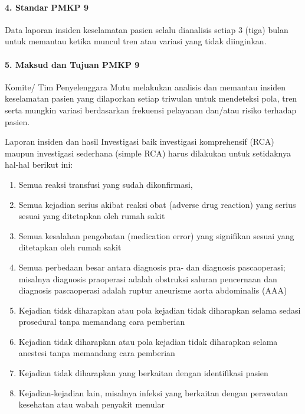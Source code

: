 \documentclass[
]{book}
\providecommand{\tightlist}{%
  \setlength{\itemsep}{0pt}\setlength{\parskip}{0pt}}
\begin{document}
\hypertarget{standar-pmkp-9}{%
\paragraph*{4. Standar PMKP 9}\label{standar-pmkp-9}}

Data laporan insiden keselamatan pasien selalu dianalisis setiap 3 (tiga) bulan untuk memantau ketika muncul tren atau variasi yang tidak diinginkan.

\hypertarget{maksud-dan-tujuan-pmkp-9}{%
\paragraph*{5. Maksud dan Tujuan PMKP 9}\label{maksud-dan-tujuan-pmkp-9}}

Komite/ Tim Penyelenggara Mutu melakukan analisis dan memantau insiden keselamatan pasien yang dilaporkan setiap triwulan untuk mendeteksi pola, tren serta mungkin variasi berdasarkan frekuensi pelayanan dan/atau risiko terhadap pasien.

Laporan insiden dan hasil Investigasi baik investigasi komprehensif (RCA) maupun investigasi sederhana (simple RCA) harus dilakukan untuk setidaknya hal-hal berikut ini:

\begin{enumerate}
\def\labelenumi{\alph{enumi}.}
\tightlist
\item
  Semua reaksi transfusi yang sudah dikonfirmasi,
\item
  Semua kejadian serius akibat reaksi obat (adverse drug reaction) yang serius sesuai yang ditetapkan oleh rumah sakit
\item
  Semua kesalahan pengobatan (medication error) yang signifikan sesuai yang ditetapkan oleh rumah sakit
\item
  Semua perbedaan besar antara diagnosis pra- dan diagnosis pascaoperasi; misalnya diagnosis praoperasi adalah obstruksi saluran pencernaan dan diagnosis pascaoperasi adalah ruptur aneurisme aorta abdominalis (AAA)
\item
  Kejadian tidsk diharapkan atau pola kejadian tidak diharapkan selama sedasi prosedural tanpa memandang cara pemberian
\item
  Kejadian tidak diharapkan atau pola kejadian tidak diharapkan selama anestesi tanpa memandang cara pemberian
\item
  Kejadian tidak diharapkan yang berkaitan dengan identifikasi pasien
\item
  Kejadian-kejadian lain, misalnya infeksi yang berkaitan dengan perawatan kesehatan atau wabah penyakit menular
\end{enumerate}
\end{document}
